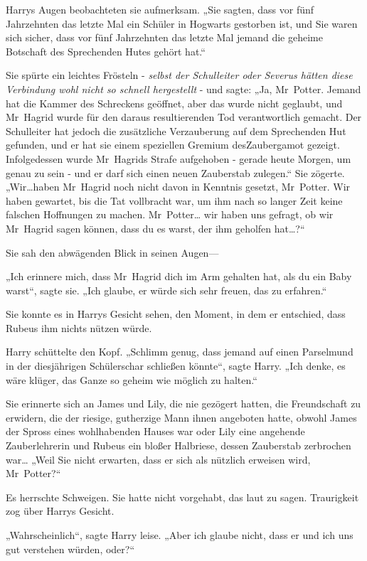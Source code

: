 {Harrys Augen beobachteten sie aufmerksam. „Sie sagten, dass vor fünf Jahrzehnten das letzte Mal ein Schüler in Hogwarts gestorben ist, und Sie waren sich sicher, dass vor fünf Jahrzehnten das letzte Mal jemand die geheime Botschaft des Sprechenden Hutes gehört hat.“

Sie spürte ein leichtes Frösteln - \emph{selbst der Schulleiter oder Severus hätten diese Verbindung wohl nicht so schnell hergestellt} - und sagte: „Ja, Mr~Potter. Jemand hat die Kammer des Schreckens geöffnet, aber das wurde nicht geglaubt, und Mr~Hagrid wurde für den daraus resultierenden Tod verantwortlich gemacht. Der Schulleiter hat jedoch die zusätzliche Verzauberung auf dem Sprechenden Hut gefunden, und er hat sie einem speziellen Gremium desZaubergamot gezeigt. Infolgedessen wurde Mr~Hagrids Strafe aufgehoben - gerade heute Morgen, um genau zu sein - und er darf sich einen neuen Zauberstab zulegen.“ Sie zögerte. „Wir…haben Mr~Hagrid noch nicht davon in Kenntnis gesetzt, Mr~Potter. Wir haben gewartet, bis die Tat vollbracht war, um ihm nach so langer Zeit keine falschen Hoffnungen zu machen. Mr~Potter… wir haben uns gefragt, ob wir Mr~Hagrid sagen können, dass du es warst, der ihm geholfen hat…?“

Sie sah den abwägenden Blick in seinen Augen—

„Ich erinnere mich, dass Mr~Hagrid dich im Arm gehalten hat, als du ein Baby warst“, sagte sie. „Ich glaube, er würde sich sehr freuen, das zu erfahren.“

Sie konnte es in Harrys Gesicht sehen, den Moment, in dem er entschied, dass Rubeus ihm nichts nützen würde.

Harry schüttelte den Kopf. „Schlimm genug, dass jemand auf einen Parselmund in der diesjährigen Schülerschar schließen könnte“, sagte Harry. „Ich denke, es wäre klüger, das Ganze so geheim wie möglich zu halten.“

Sie erinnerte sich an James und Lily, die nie gezögert hatten, die Freundschaft zu erwidern, die der riesige, gutherzige Mann ihnen angeboten hatte, obwohl James der Spross eines wohlhabenden Hauses war oder Lily eine angehende Zauberlehrerin und Rubeus ein bloßer Halbriese, dessen Zauberstab zerbrochen war… „Weil Sie nicht erwarten, dass er sich als nützlich erweisen wird, Mr~Potter?“

Es herrschte Schweigen. Sie hatte nicht vorgehabt, das laut zu sagen. Traurigkeit zog über Harrys Gesicht.

„Wahrscheinlich“, sagte Harry leise. „Aber ich glaube nicht, dass er und ich uns gut verstehen würden, oder?“

}
